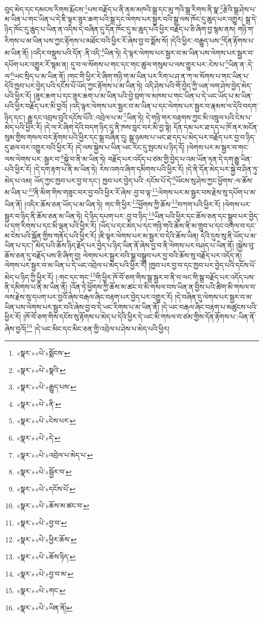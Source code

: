 བུད་མེད་དང་དམངས་རིགས་རྨོངས་\footnote{«སྣར་»«པེ་»སྨོངས་}པས་བརྗོད་པ་ནི་ནམ་མཁའི་སྒྲ་དང་མུ་ཀའི་སྒྲ་རིགས་ནི་སྣ་\footnote{«སྣར་»«པེ་»སྣའི་}རྩེའི་སྒྲ་ཤེས་པ་མ་ཡིན་པ་གང་ཡིན་པ་དེ་ཇི་ལྟར་ཟུར་ཆག་པའི་སྒྲ་དང་ལེགས་པར་སྦྱར་བའི་སྒྲ་ལས་ཁོང་དུ་ཆུད་པར་འགྱུར། སྒྲ་དེ་ཉིད་ཁོང་དུ་ཆུད་པ་ཡིན་ན་འདིས་དེ་བཞིན་དུ་དོན་ཁོང་དུ་མ་ཆུད་པའི་ཕྱིར་བརྗོད་པ་ཅི་ཞིག་བྱ་སྙམ་ནས། གཉི་ག་རིགས་པ་མ་ཡིན་པས་ཀྱང་རྟོགས་པ་མཐོང་བའི་ཕྱིར་རོ་ཞེས་བྱ་བ་སྨོས་སོ། །དེའི་ཕྱིར་:བརྒྱུད་པས་\footnote{«སྣར་»«པེ་»རྒྱུད་པས་}དོན་རྟོགས་པ་མ་ཡིན་ནོ། །འདིར་བསྡུས་པའི་དོན་:ནི་འདི་\footnote{«སྣར་»«པེ་»ནི་}ཡིན་ཏེ། དེ་ལྟར་ལེགས་པར་སྦྱར་བ་མ་ཡིན་པས་ལེགས་པར་སྦྱར་བ་དཔོག་པར་འགྱུར་རོ་སྙམ་ན། དུ་བ་ལ་སོགས་པ་གང་དང་གང་ཚུལ་གསུམ་པ་ལས་གྱུར་པར་:ངེས་པ་\footnote{«སྣར་»«པེ་»ངེས་པར་}ཡིན་ན་:དེ་ལ་\footnote{«སྣར་»«པེ་»དེ་}ཡང་སྲིད་པ་མ་ཡིན་ནོ། །གང་གི་ཕྱིར་རེ་ཞིག་གཉི་ག་མ་ཡིན་པར་རིག་པ་ཤ་ན་ཀ་ལ་སོགས་པ་གང་ཡིན་པ་དེའི་ཁྱབ་པར་བྱེད་པའི་དངོས་པོ་ཡོད་ཀྱང་རྟོགས་པ་མ་ཡིན་ཏེ། འདི་ཤེས་པའི་གོ་བྱེད་ཀྱི་ཡན་ལག་ཤེས་བྱེད་མེད་པའི་ཕྱིར་རོ། །ཟུར་ཆག་པ་དང་ཟུར་ཆག་པ་མ་ཡིན་པའི་བྱེ་བྲག་ལ་མཁས་པ་གང་ཡིན་པ་དེ་ཡང་ཡོད་པ་མ་ཡིན་པའི་ཕྱིར་བརྗོད་པར་མི་བྱའོ། །འདི་ལྟར་ལེགས་པར་སྦྱར་བ་མ་ཡིན་པ་དང་ལེགས་པར་སྦྱར་བ་རྣམས་ལ་དེའི་བདག་ཉིད་དང་། རྒྱུ་དང་འབྲས་བུའི་དངོས་པོའི་:འབྲེལ་པ་མ་\footnote{«སྣར་»«པེ་»འབྲེལ་པ་མེད་པ་}ཡིན་ཏེ། དེ་གཉི་གར་བརྟགས་ཀྱང་མི་འཁྲུལ་པའི་ངེས་པ་མེད་པའི་ཕྱིར་རོ། །དེ་ལ་རེ་ཞིག་དེའི་བདག་ཉིད་དུ་ནི་ཁས་བླང་བར་མི་བྱ་སྟེ། དོན་དམ་པར་ཐ་དད་པ་ཁོ་ནར་མངོན་སུམ་གྱིས་གསལ་བར་རྟོགས་པའི་ཕྱིར་དང་སྒྲ་བཞིན་དུ། སྒྲ་ཉམས་པ་ཡང་ཐ་དད་པ་མེད་པར་བརྗོད་པར་བྱ་བ་ཉིད་དུ་ཐལ་བར་འགྱུར་བའི་ཕྱིར་རོ། །དེ་ལས་སྐྱེས་པ་ཡིན་ཡང་རིང་དུ་སྤངས་པ་ཉིད་དོ། །ལེགས་པར་མ་སྦྱར་བ་གང་ལས་ལེགས་པར་:སྦྱར་བ་\footnote{«སྣར་»«པེ་»སྦྱོར་བ་}སྐྱེ་བ་ནི་མ་ཡིན་ཏེ། བརྗོད་པར་འདོད་པ་ཙམ་གྱི་བྱེད་པ་འམ་ཡོན་ཏན་དེ་དག་རྒྱུ་ཡིན་པའི་ཕྱིར་རོ། །དེ་དག་རྟག་པ་ནི་མ་ཡིན་ཏེ། རེས་འགའ་ཞིག་དམིགས་པའི་ཕྱིར་རོ། །དེ་ནི་དོན་མེད་པར་སྐྱེ་བ་ཤིན་ཏུ་མེད་པ་འམ། ཡོད་ཀྱང་ཁྱབ་པར་བྱ་བ་དང་། ཁྱབ་པར་བྱེད་པའི་:དངོས་པོ་དེ་\footnote{«སྣར་»«པེ་»དངོས་པོ་}ཡོངས་སུ་ཤེས་ཀྱང་ཕྱོགས་:ལ་ཆོས་མ་ཡིན་པ་\footnote{«སྣར་»«པེ་»ཆོས་མ་ཚང་བ་}ནི་མིག་གིས་གཟུང་བར་བྱ་བའི་ཕྱིར་རོ་ཞེས་:བྱ་བ་ལྟ་\footnote{«སྣར་»«པེ་»བྱ་བ་}ལེགས་པར་མ་སྦྱར་བས་རྗེས་སུ་དཔོག་པ་མ་ཡིན་ནོ། །འདིར་ཆོས་ཅན་ཡོད་པ་མ་ཡིན་ཏེ། གང་གི་ཕྱིར་\footnote{«སྣར་»«པེ་»ཕྱིར་ཆོས་}ཕྱོགས་ཀྱི་ཆོས་\footnote{«སྣར་»«པེ་»ཆོས་ཉིད་}བཀག་པའི་ཕྱིར་རོ། །ལེགས་པར་སྦྱར་བ་ཉིད་ནི་ཆོས་ཅན་མ་ཡིན་ཏེ། དེ་ཉིད་དཔག་པར་:བྱ་བ་ཉིད་\footnote{«སྣར་»«པེ་»བྱ་བ་མ་}ཡིན་པའི་ཕྱིར་དང་ཆོས་ཅན་དང་སྒྲུབ་པར་བྱེད་པ་དག་རིགས་པ་དང་མི་ལྡན་པའི་ཕྱིར་རོ། །ཡོད་པ་དང་མེད་པ་དང་གཉི་གའི་ཆོས་ནི་མ་གྲུབ་པ་དང་འགལ་བ་དང་མ་ངེས་པའི་སྐྱོན་གྱིས་གནོད་པའི་ཕྱིར་རོ། །ཇི་ལྟར་ལེགས་པར་མ་སྦྱར་བ་དེའི་ཆོས་ཡིན། དེའི་དུས་སུ་ནི་ཡོད་པ་མ་ཡིན་པ་དང་། མེད་པའི་ཆོས་ཉིད་རྗོད་པར་བྱེད་པ་ཉིད་ཡིན་ནོ་ཞེས་བྱ་བ་ནི་ལེགས་པར་བཤད་པ་ཡིན་ནོ། །སྐྱེས་བུ་ཆོས་ཅན་དུ་བརྗོད་པས་ཅི་ཞིག་བྱ། ལེགས་པར་སྦྱར་བའི་སྒྲ་བསྒྲུབ་པར་བྱ་བའི་ཆོས་སུ་བརྗོད་པར་འདོད་ན། ལེགས་པར་སྦྱར་བ་མ་ཡིན་པ་དེ་ཡང་འབྲེལ་པ་མེད་པའི་ཕྱིར་རོ། །ཁྱབ་པར་བྱ་བ་དང་ཁྱབ་པར་བྱེད་པའི་དངོས་པོ་མེད་པ་ཉིད་ཀྱི་ཕྱིར་རོ། །:གང་དང་གང་\footnote{«སྣར་»«པེ་»གང་}གི་ཕྱིར་ཁོ་བོ་ཅག་གིས་སྒྲ་སྦྱར་བ་ནི་བ་ལང་གི་སྒྲ་བརྗོད་པར་འདོད་པས་ནི་དམིགས་པ་ནི་མ་ཡིན་ནོ། །འོན་ཏེ་ཕྱོགས་ཀྱི་ཆོས་མ་ཚང་བ་མི་གསལ་བས་ཡིན་ན་བྱིས་པའི་ཚིག་མི་གསལ་བ་ལས་རྗེས་སུ་དཔག་པར་བྱའོ་ཞེས་བརྒལ་ཞིང་བརྟག་པར་བྱེད་པར་འགྱུར་རོ། །དེ་བཞིན་དུ་ལེགས་པར་སྦྱར་བ་མ་ཡིན་པས་ལེགས་པར་སྦྱར་བའི་ཞེས་བྱ་བ་དེ་ཡང་རིགས་པ་མ་ཡིན་ནོ། །དེ་ཡང་བརྒལ་ཞིང་བརྟག་པ་མཚུངས་པའི་ཕྱིར་རོ། །ཁོ་བོ་ཅག་གིས་དངོས་སུ་རྟོགས་པ་མེད་པ་དེའི་ཕྱིར་དེ་ཡང་མི་གསལ་བ་ཙམ་གྱིས་དོན་རྟོགས་པ་:ཡིན་ནོ་ཞེས་བྱའོ།\footnote{«སྣར་»«པེ་»ཡིན་ནོ།} །དེ་ཡང་མིང་དང་མིང་ཅན་གྱི་འབྲེལ་པ་ཤེས་པ་མེད་པའི་ཕྱིར། 